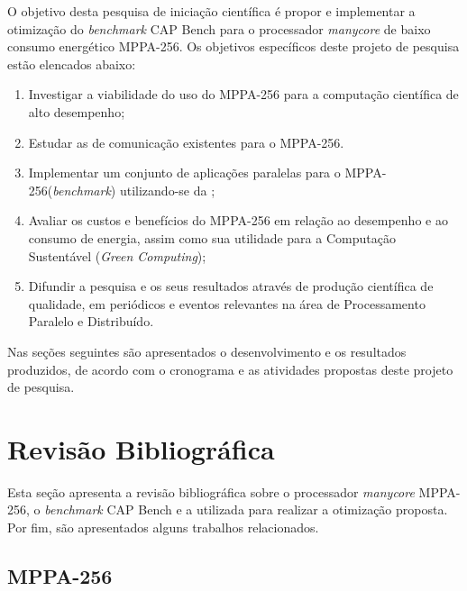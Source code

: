 \documentclass[a4paper,11pt]{article}
\newcommand{\mppa}{MPPA-256\xspace}
\newcommand{\capb}{CAP Bench\xspace}
\newcommand{\manycore}{\textit{manycore}\xspace}
\newcommand{\bench}{\textit{benchmark}\xspace}
\begin{document}
O objetivo desta pesquisa de iniciação científica é propor e implementar a otimização do \bench \capb para o processador \manycore de baixo consumo energético \mppa. Os objetivos específicos deste projeto de pesquisa estão elencados abaixo:

\begin{enumerate}
	\setlength\itemsep{0em}
	\item Investigar a viabilidade do uso do \mppa para a computação científica de alto desempenho;
	\item Estudar as \apis de comunicação existentes para o \mppa.
	\item Implementar um conjunto de aplicações paralelas para o \mppa (\bench) utilizando-se da \api \async;
	\item Avaliar os custos e benefícios do \mppa em relação ao desempenho e ao consumo de energia, assim como sua utilidade para a Computação Sustentável (\textit{Green Computing});
	\item Difundir a pesquisa e os seus resultados através de produção científica de qualidade, em periódicos e eventos relevantes na área de Processamento Paralelo e Distribuído.
\end{enumerate}

Nas seções seguintes são apresentados o desenvolvimento e os resultados produzidos, de acordo com o cronograma e as atividades propostas deste projeto de pesquisa.

\section{Revisão Bibliográfica}

Esta seção apresenta a revisão bibliográfica sobre o processador \manycore \mppa, o \textit{benchmark} \capb e a \api utilizada para realizar a otimização proposta. Por fim, são apresentados alguns trabalhos relacionados.

\subsection{MPPA-256}
\label{subsec:mppa}
\end{document}
